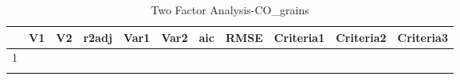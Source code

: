 \begin{longtable}{rllrrrrrlll}
  \hline
 & V1 & V2 & r2adj & Var1 & Var2 & aic & RMSE & Criteria1 & Criteria2 & Criteria3 \\ 
  \hline
1 &  &  &  &  &  &  &  &  &  &  \\ 
   \hline
\hline
\caption{Two Factor Analysis-CO_grains} 
\end{longtable}
